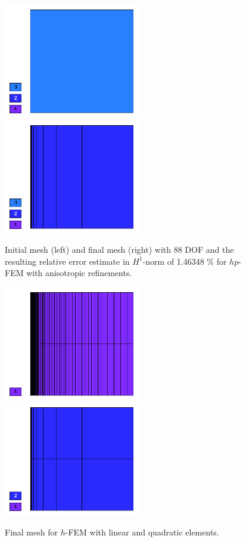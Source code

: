 \begin{figure}[!ht]
\centering
\includegraphics[height=5cm]{nist/nist-7/mesh_hp_aniso_init.png}\ \
\includegraphics[height=5cm]{nist/nist-7/mesh_hp_aniso.png}
\caption{Initial mesh (left) and final mesh (right) with 88 DOF and the resulting relative error estimate in $H^1$-norm of 1.46348 \% for $hp$-FEM with anisotropic refinements.}
\label{fig:nist-7-hp-aniso}
\end{figure}

\begin{figure}[!ht]
\centering
\includegraphics[height=5cm]{nist/nist-7/mesh_h1_aniso.png}\ \
\includegraphics[height=5cm]{nist/nist-7/mesh_h2_aniso.png}
\caption{Final mesh for $h$-FEM with linear and quadratic elements.}
\label{fig:nist-7-h-aniso}
\end{figure}

